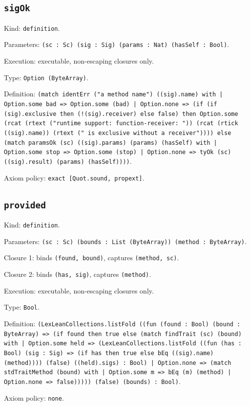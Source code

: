 \documentclass[11pt]{article}
\begin{document}
\subsection*{\texttt{sigOk}}
\noindent Kind: \texttt{definition}.\par
\noindent Parameters: \texttt{(sc : Sc) (sig : Sig) (params : Nat) (hasSelf : Bool)}.\par
\noindent Execution: executable, non-escaping closures only.\par
\noindent Type: \texttt{Option (ByteArray)}.\par
\noindent Definition: \texttt{(match identErr ("a method name") ((sig).name) with | Option.some bad => Option.some (bad) | Option.none => (if (if (sig).exclusive then (!(sig).receiver) else false) then Option.some (rcat (rtext ("runtime support: function-receiver: ")) (rcat (rtick ((sig).name)) (rtext (" is exclusive without a receiver")))) else (match paramsOk (sc) ((sig).params) (params) (hasSelf) with | Option.some stop => Option.some (stop) | Option.none => tyOk (sc) ((sig).result) (params) (hasSelf))))}.\par
\noindent Axiom policy: \texttt{exact [Quot.sound, propext]}.\par
\subsection*{\texttt{provided}}
\noindent Kind: \texttt{definition}.\par
\noindent Parameters: \texttt{(sc : Sc) (bounds : List (ByteArray)) (method : ByteArray)}.\par
\noindent Closure 1: binds \texttt{(found, bound)}, captures \texttt{(method, sc)}.\par
\noindent Closure 2: binds \texttt{(has, sig)}, captures \texttt{(method)}.\par
\noindent Execution: executable, non-escaping closures only.\par
\noindent Type: \texttt{Bool}.\par
\noindent Definition: \texttt{(LexLeanCollections.listFold ((fun (found : Bool) (bound : ByteArray) => (if found then true else (match findTrait (sc) (bound) with | Option.some held => (LexLeanCollections.listFold ((fun (has : Bool) (sig : Sig) => (if has then true else bEq ((sig).name) (method)))) (false) ((held).sigs) : Bool) | Option.none => (match stdTraitMethod (bound) with | Option.some m => bEq (m) (method) | Option.none => false))))) (false) (bounds) : Bool)}.\par
\noindent Axiom policy: \texttt{none}.\par
\end{document}
